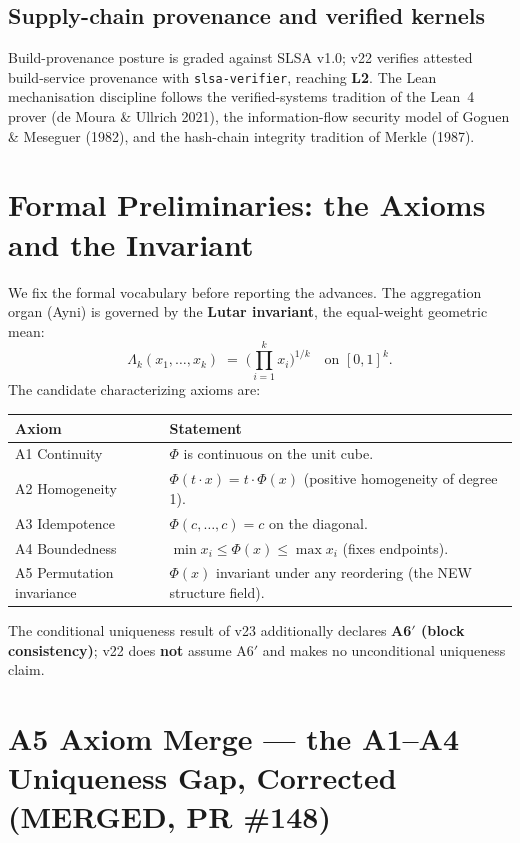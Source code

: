 \documentclass[11pt]{article}
\theoremstyle{plain}
\theoremstyle{definition}
\theoremstyle{remark}
\newcommand{\La}{\Lambda}
\begin{document}
\subsection{Supply-chain provenance and verified kernels}
Build-provenance posture is graded against SLSA v1.0; v22 verifies attested
build-service provenance with \texttt{slsa-verifier}, reaching \textbf{L2}. The Lean
mechanisation discipline follows the verified-systems tradition of the Lean~4 prover
(de Moura \& Ullrich 2021), the information-flow security model of Goguen \&
Meseguer (1982), and the hash-chain integrity tradition of Merkle (1987).

\section{Formal Preliminaries: the Axioms and the Invariant}

We fix the formal vocabulary before reporting the advances. The aggregation organ
(Ayni) is governed by the \textbf{Lutar invariant}, the equal-weight geometric mean:
\[
\La_k(x_1,\dots,x_k) \;=\; \Big(\textstyle\prod_{i=1}^{k} x_i\Big)^{1/k}
\quad\text{on } [0,1]^k.
\]
The candidate characterizing axioms are:

\begin{center}
\begin{tabular}{@{}ll@{}}
\toprule
\textbf{Axiom} & \textbf{Statement} \\
\midrule
A1 Continuity & $\Phi$ is continuous on the unit cube. \\
A2 Homogeneity & $\Phi(t\cdot x)=t\cdot\Phi(x)$ (positive homogeneity of degree 1). \\
A3 Idempotence & $\Phi(c,\dots,c)=c$ on the diagonal. \\
A4 Boundedness & $\min x_i \le \Phi(x) \le \max x_i$ (fixes endpoints). \\
A5 Permutation invariance & $\Phi(x)$ invariant under any reordering (the NEW structure field). \\
\bottomrule
\end{tabular}
\end{center}

\noindent The conditional uniqueness result of v23 additionally declares
\textbf{A6$'$ (block consistency)}; v22 does \textbf{not} assume A6$'$ and makes no
unconditional uniqueness claim.

\section{A5 Axiom Merge --- the A1--A4 Uniqueness Gap, Corrected (MERGED, PR \#148)}
\end{document}
